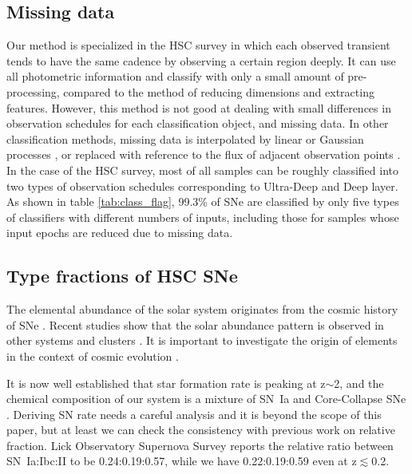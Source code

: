 \documentclass[useamsfonts]{pasj01}
\begin{document}
\subsection{Missing data}
%
Our method is specialized in the HSC survey in which each observed transient tends to have the same cadence by observing a certain region deeply.
It can use all photometric information and classify with only a small amount of pre-processing, compared to the method of reducing dimensions and extracting features. 
However, this method is not good at dealing with small differences in observation schedules for each classification object, and missing data.
In other classification methods, missing data is interpolated by linear or Gaussian processes \citep{Lochner_2016,Muthukrishna_2019}, or replaced with reference to the flux of adjacent observation points \citep{charnock17a}.
In the case of the HSC survey, most of all samples can be roughly classified into two types of observation schedules corresponding to Ultra-Deep and Deep layer.
As shown in table \ref{tab:class_flag}, 99.3\% of SNe are classified by only five types of classifiers with different numbers of inputs, including those for samples whose input epochs are reduced due to missing data.
%
%
\subsection{Type fractions of HSC SNe}
The elemental abundance of the solar system \citep{grevesse98a} originates from the cosmic history of SNe \citep{maraston05a,kobayashi00a}.  
Recent studies show that the solar abundance pattern is observed in other systems \citep{ramirez09a} and clusters \citep{mernier18a}. 
It is important to investigate the origin of elements in the context of cosmic evolution \citep{fukugita04a}. 

It is now well established that star formation rate is peaking at z$\sim$2, and the chemical composition of our system is a mixture of SN~Ia and Core-Collapse SNe \citep{tsujimoto95a,kobayashi11a}.
Deriving SN rate needs a careful analysis \citep{dilday08a,brown19a,frohmaier19a} and it is beyond the scope of this paper, but at least we can check the consistency with previous work on relative fraction.
Lick Observatory Supernova Survey \citep{li11a} reports the relative ratio between SN~Ia:Ibc:II to be 0.24:0.19:0.57, while we have 0.22:0.19:0.59 even at z$\lesssim$0.2. 
\end{document}
